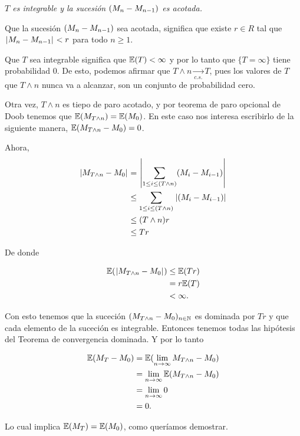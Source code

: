 \emph{
    $T$ es integrable y la sucesi\'on $\left( M_n-M_{n-1}\right) $ es acotada.
}

Que la sucesión $\left( M_n-M_{n-1}\right) $ sea acotada, significa que existe $r \in R$ tal que
$\hspace{.25mm}\left|M_n - M_{n-1}\right|\hspace{.25mm} < r$ para todo $n \geq 1$.\par\null

Que $T$ sea integrable significa que $\mathbb{E}(T) < \infty$ y por lo tanto que $\{ T = \infty \}$ tiene
probabilidad 0. De esto, podemos afirmar que $T \wedge n \underset{c.s.}\longrightarrow T$, pues los
valores de $T$ que $T \wedge n$ nunca va a alcanzar, son un conjunto de probabilidad cero.\par\null

Otra vez, $T \wedge n$ es tiepo de paro acotado, y por teorema de paro opcional de Doob tenemos que 
$\mathbb{E}(M_{T \wedge n}) = \mathbb{E}(M_0)$. En este caso nos interesa escribirlo de la siguiente manera, 
$\mathbb{E}(M_{T \wedge n} - M_0) = 0$.\par\null

Ahora, 
\begin{align}
    \hspace{.25mm}\left|M_{T \wedge n} - M_0\right|\hspace{.25mm}  &=      \hspace{.25mm}\left|\sum_{1 \leq i \leq (T \wedge n)} (M_i - M_{i-1})\right|\hspace{.25mm}     \\
                                &\leq   \sum_{1 \leq i \leq (T \wedge n)} \hspace{.25mm}\left|(M_i - M_{i-1})\right|\hspace{.25mm}     \\
                                &\leq   (T \wedge n) r                                              \\      
                                &\leq   T r                                                    
\end{align}

De donde 

\begin{align}
        \mathbb{E}(\hspace{.25mm}\left|M_{T \wedge n} - M_0\right|\hspace{.25mm})  &\leq   \mathbb{E}(T r) \\
                                        &= r \mathbb{E}(T)      \\
                                        &< \infty.
\end{align} \par\null

Con esto tenemos que la suceción $(M_{T \wedge n} - M_0)_{n \in \mathbb{N}}$ es dominada por $Tr$ y que cada 
elemento de la suceción es integrable. Entonces tenemos todas las hipótesis del Teorema de convergencia dominada.
Y por lo tanto

\begin{align}
        \mathbb{E}(M_T - M_0)   &=  \mathbb{E}(\lim_{n \rightarrow \infty} M_{T \wedge n} - M_0)        \\
                        &=  \lim_{n \rightarrow \infty} \mathbb{E}(M_{T \wedge n} - M_0)        \\
                        &=  \lim_{n \rightarrow \infty} 0                               \\
                        &=  0.                        
\end{align}

Lo cual implica $\mathbb{E}(M_T) = \mathbb{E}(M_0)$, como queríamos demostrar.